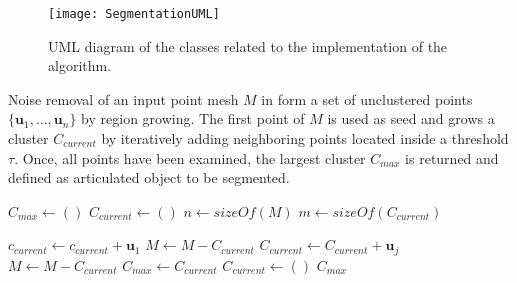 
\begin{figure}
	\centering
	\texttt{[image: SegmentationUML]}
	\caption{UML diagram of the classes related to the implementation of the algorithm.}
	\label{fig:UML}
\end{figure}

\begin{algorithm}[tbp]
	\caption{Noise removal of an input point mesh $M$ in form a set of unclustered points $\{\boldsymbol{u}_1,\ldots,\boldsymbol{u}_n\}$ by region growing. The first point of $M$ is used as seed and grows a cluster $C_{current}$ by iteratively adding neighboring points located inside a threshold $\tau$. Once, all points have been examined, the largest cluster $C_{max}$ is returned and defined as articulated object to be segmented.}
	
	\begin{algorithmic}[1]     %
		\label{noiseRemoval}
		
		\State $\mathit{C_{max}} \gets ()$
		\State $\mathit{C_{current}} \gets ()$
		\State $n \gets \mathit{sizeOf}(M)$
		\State $m \gets \mathit{sizeOf}(C_{current})$
		
		\State $\mathit{c_{current}} \gets \mathit{c_{current}} + \boldsymbol{u}_1$
		\State $M \gets M - C_{current}$
			\State $C_{current} \gets C_{current} + \boldsymbol{u}_j$
			\EndIf
			\EndFor
		\EndFor
		\State $M \gets M - C_{current}$
		\State $C_{max} \gets C_{current}$
		\EndIf
		\State $C_{current} \gets ()$
		\EndWhile
		\State\Return $C_{max}$
		\EndProcedure	
	\end{algorithmic}
\end{algorithm}

